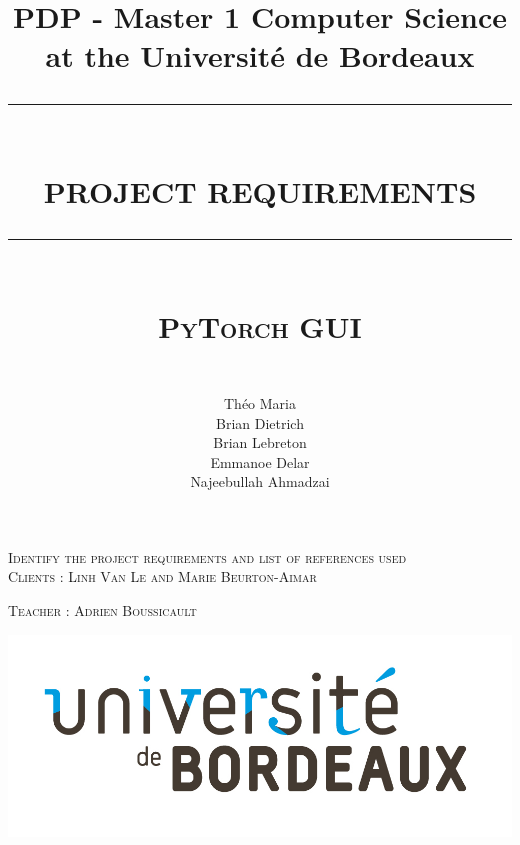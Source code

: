 \newcommand{\HRule}{\rule{\linewidth}{0.5mm}}
\begin{titlepage}
   \title{
       \large{PDP - Master 1 Computer Science at the Université de Bordeaux}
       \HRule\\
       \LARGE\textbf{PROJECT REQUIREMENTS}
       \HRule\\
       \textsc{PyTorch GUI} %
   }
   
   
   \author{\\Théo Maria\\Brian Dietrich\\Brian Lebreton\\Emmanoe Delar\\Najeebullah Ahmadzai}
   
   \nointerlineskip
   \vfill
   \let\snewpage \newpage
   \let\newpage \relax
   \maketitle
   \let \newpage \snewpage
   
   \center
   \textsc{Identify the project requirements and list of references used}\\
   \textsc{Clients : Linh Van Le and Marie Beurton-Aimar}
   
   \textsc{Teacher : Adrien Boussicault}
   
   \includegraphics[scale=0.2]{figures/logo.jpg}\\
   \break
   \vfill

\end{titlepage}